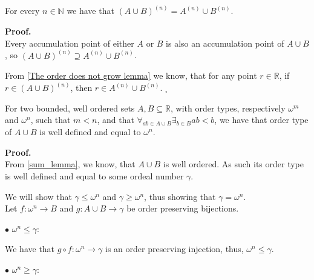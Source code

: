 
\begin{corollary}\label{derivative and sum is commutative}
For every $n\in\mathbb{N}$ we have that $(A\cup B)^{(n)} = A^{(n)}\cup B^{(n)}$.
\end{corollary}
\textbf{Proof.} \\


Every accumulation point of either $A$ or $B$ is also an accumulation point of $A\cup B$, so 
$(A\cup B)^{(n)} \supseteq A^{(n)}\cup B^{(n)}$.

From \ref{The order does not grow lemma} we know, that for any point $r\in \mathbb{R}$, if 
$r \in (A\cup B)^{(n)}$, then $r \in  A^{(n)}\cup B^{(n)}$. $_\square$

\begin{lemma}\label{key_lemma}
For two bounded, well ordered sets $A, B \subseteq \mathbb{R}$, with order types, respectively 
$\omega^m$ 
and $\omega^n$, 
such that $m < n$, and that $\forall_{a\!\!\!b\in A\cup B}\exists_{b\in B}a\!\!\!b<b$, we have 
that order type of $A \cup B$ is well defined and 
equal to $\omega^n$.
\end{lemma}
\textbf{Proof.} \\
From \ref{sum_lemma}, we know, that $A\cup B$ is well ordered. As such its order type is well 
defined and equal to some ordeal number $\gamma$. 

We will show that $\gamma \leq \omega^n$ and $\gamma \geq \omega^n$, 
thus showing that $\gamma = \omega^n$. \\

Let $f : \omega^n \to B$ and $g : A \cup B \to \gamma$ be order preserving bijections. 

$\bullet$ $\omega^n \leq \gamma$: 

We have that  
$g\circ f : \omega^n \to \gamma$ 
is an order preserving injection, thus, $\omega^n \leq \gamma$. 

$\bullet$ $\omega^n \geq \gamma$: 

